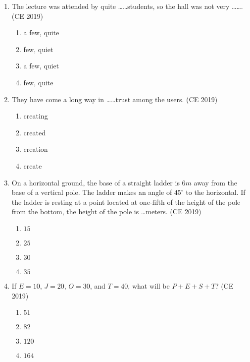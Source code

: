 \documentclass[journal]{IEEEtran}
\begin{document}
\begin{enumerate}
    
    \item The lecture was attended by quite \ldots\ldots students, so the hall was not very \ldots\ldots. \hfill (CE 2019)
    \begin{multicols}{4}
        \begin{enumerate}
            \item a few, quite
            \item few, quiet
            \item a few, quiet
            \item few, quite
        \end{enumerate}
    \end{multicols}

    \item They have come a long way in \ldots\ldots trust among the users.  \hfill (CE 2019)
    \begin{multicols}{4}
        \begin{enumerate}
            \item creating
            \item created
            \item creation
            \item create
        \end{enumerate}
    \end{multicols}

    \item On a horizontal ground, the base of a straight ladder is $6 m$ away from the base of a vertical pole. The ladder makes an angle of $45^\circ$ to the horizontal. If the ladder is resting at a point located at one-fifth of the height of the pole from the bottom, the height of the pole is \ldots meters.  \hfill (CE 2019)
    \begin{multicols}{4}
        \begin{enumerate}
            \item $15$
            \item $25$
            \item $30$
            \item $35$
        \end{enumerate}
    \end{multicols}

    \item If $E = 10$, $J = 20$, $O = 30$, and $T = 40$, what will be $P + E + S + T$?  \hfill (CE 2019)
    \begin{multicols}{4}
        \begin{enumerate}
            \item $51$
            \item $82$
            \item $120$
            \item $164$
        \end{enumerate}
    \end{multicols}


\end{enumerate}
\end{document}
